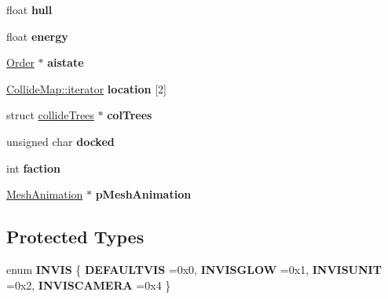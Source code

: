 \begin{DoxyCompactItemize}
\item 
float {\bfseries hull}\hypertarget{classUnit_a022c3d608d4eb4f6aafaabd7388c3b17}{}\label{classUnit_a022c3d608d4eb4f6aafaabd7388c3b17}

\item 
float {\bfseries energy}\hypertarget{classUnit_a541f4549f8bf62f291e21fbfc7ae18bc}{}\label{classUnit_a541f4549f8bf62f291e21fbfc7ae18bc}

\item 
\hyperlink{classOrder}{Order} $\ast$ {\bfseries aistate}\hypertarget{classUnit_ac45347999456e586e578a9b3938c8bd8}{}\label{classUnit_ac45347999456e586e578a9b3938c8bd8}

\item 
\hyperlink{classCollidable}{Collide\+Map\+::iterator} {\bfseries location} \mbox{[}2\mbox{]}\hypertarget{classUnit_a2f39953246a6aa793d8a08d591e36a20}{}\label{classUnit_a2f39953246a6aa793d8a08d591e36a20}

\item 
struct \hyperlink{structcollideTrees}{collide\+Trees} $\ast$ {\bfseries col\+Trees}\hypertarget{classUnit_ae659c5e8bbed800ffdf77a7422c26517}{}\label{classUnit_ae659c5e8bbed800ffdf77a7422c26517}

\item 
unsigned char {\bfseries docked}\hypertarget{classUnit_aeb5858e28f00e25967ec669eaa063e1a}{}\label{classUnit_aeb5858e28f00e25967ec669eaa063e1a}

\item 
int {\bfseries faction}\hypertarget{classUnit_a9e865df25b016fec2fe80df6b59eccbb}{}\label{classUnit_a9e865df25b016fec2fe80df6b59eccbb}

\item 
\hyperlink{classMeshAnimation}{Mesh\+Animation} $\ast$ {\bfseries p\+Mesh\+Animation}\hypertarget{classUnit_a6a1f8943768c9fb1604f5eb206fe9adb}{}\label{classUnit_a6a1f8943768c9fb1604f5eb206fe9adb}

\end{DoxyCompactItemize}
\subsection*{Protected Types}
\begin{DoxyCompactItemize}
\item 
enum {\bfseries I\+N\+V\+IS} \{ {\bfseries D\+E\+F\+A\+U\+L\+T\+V\+IS} =0x0, 
{\bfseries I\+N\+V\+I\+S\+G\+L\+OW} =0x1, 
{\bfseries I\+N\+V\+I\+S\+U\+N\+IT} =0x2, 
{\bfseries I\+N\+V\+I\+S\+C\+A\+M\+E\+RA} =0x4
 \}\hypertarget{classUnit_ac94626965649a3c2c698cca02a376c9a}{}\label{classUnit_ac94626965649a3c2c698cca02a376c9a}

\end{DoxyCompactItemize}
